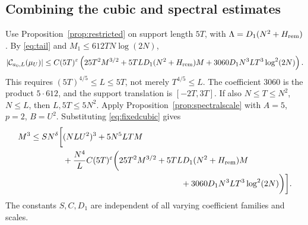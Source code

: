 \documentclass[11pt,a4paper,oneside]{article}
\theoremstyle{definition}
\newcommand{\eps}{\varepsilon}
\numberwithin{equation}{section}
\begin{document}
\subsection{Combining the cubic and spectral estimates}
Use Proposition~\ref{prop:restricted} on support length $5T$, with
$\Lambda=D_1(N^2+H_{\rm rem})$. By \eqref{eq:tail} and
$M_1\le612TN\log(2N)$,
\begin{equation}\label{eq:fixedcubic}
 |\mathcal C_{a_0,L}(\mu_U)|\le C(5T)^\eps
 \left(25T^2M^{3/2}+5TLD_1(N^2+H_{\rm rem})M
         +3060D_1N^3LT^3\log^2(2N)\right).
\end{equation}
This requires $(5T)^{4/5}\le L\le5T$, not merely $T^{4/5}\le L$.
The coefficient $3060$ is the product $5\cdot612$, and the support
translation is $[-2T,3T]$.
If also $N\le T\le N^2$, $N\le L$, then
$L,5T\le5N^2$. Apply Proposition~\ref{prop:spectralscale} with $A=5$,
$p=2$, $B=U^2$. Substituting \eqref{eq:fixedcubic} gives
\begin{equation}\label{eq:fixedraw}
\begin{aligned}
 M^3\le SN^\delta\bigg[&(NLU^2)^3+5N^5LTM\\
 &+\frac{N^4}{L}C(5T)^\eps
 \bigg(25T^2M^{3/2}+5TLD_1(N^2+H_{\rm rem})M\\
 &\hspace{50mm}+3060D_1N^3LT^3\log^2(2N)\bigg)\bigg].
\end{aligned}
\end{equation}
The constants $S,C,D_1$ are independent of all varying coefficient families and scales.
\end{document}

